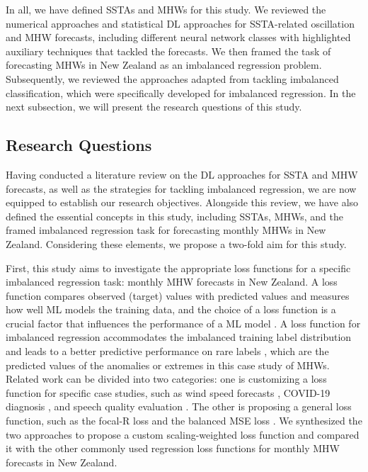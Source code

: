 \documentclass[11pt, a4paper]{article}
\begin{document}
In all, we have defined SSTAs and MHWs for this study. We reviewed the numerical approaches and statistical DL approaches for SSTA-related oscillation and MHW forecasts, including different neural network classes with highlighted auxiliary techniques that tackled the forecasts. We then framed the task of forecasting MHWs in New Zealand as an imbalanced regression problem. Subsequently, we reviewed the approaches adapted from tackling imbalanced classification, which were specifically developed for imbalanced regression. In the next subsection, we will present the research questions of this study.

\subsection{Research Questions}

Having conducted a literature review on the DL approaches for SSTA and MHW forecasts, as well as the strategies for tackling imbalanced regression, we are now equipped to establish our research objectives. Alongside this review, we have also defined the essential concepts in this study, including SSTAs, MHWs, and the framed imbalanced regression task for forecasting monthly MHWs in New Zealand. Considering these elements, we propose a two-fold aim for this study.

First, this study aims to investigate the appropriate loss functions for a specific imbalanced regression task: monthly MHW forecasts in New Zealand. A loss function compares observed (target) values with predicted values and measures how well ML models the training data, and the choice of a loss function is a crucial factor that influences the performance of a ML model \citep{nie2018investigation}. A loss function for imbalanced regression accommodates the imbalanced training label distribution and leads to a better predictive performance on rare labels \citep{ren2022balanced}, which are the predicted values of the anomalies or extremes in this case study of MHWs. Related work can be divided into two categories: one is customizing a loss function for specific case studies, such as wind speed forecasts \citep{chen2020new}, COVID-19 diagnosis \citep{khakzar2021towards}, and speech quality evaluation \citep{martin2018deep}. The other is proposing a general loss function, such as the focal-R loss \citep{yang2021delving} and the balanced MSE loss \citep{ren2022balanced}. We synthesized the two approaches to propose a custom scaling-weighted loss function and compared it with the other commonly used regression loss functions for monthly MHW forecasts in New Zealand.
\end{document}

